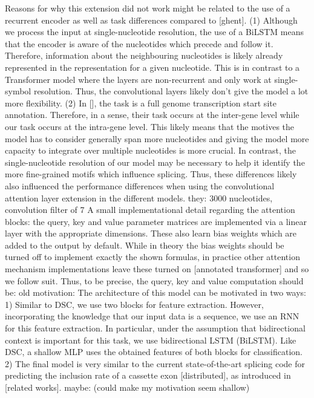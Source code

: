 Reasons for why this extension did not work might be related to the use of a recurrent encoder as well as task differences compared to [ghent].
(1) Although we process the input at single-nucleotide resolution, the use of a BiLSTM means that the encoder is aware of the nucleotides which precede and follow it. Therefore, information about the neighbouring nucleotides is likely already represented in the representation for a given nucleotide. This is in contrast to a Transformer model where the layers are non-recurrent and only work at single-symbol resolution. Thus, the convolutional layers likely don't give the model a lot more flexibility.
(2) In [], the task is a full genome transcription start site annotation. Therefore, in a sense, their task occurs at the inter-gene level while our task occurs at the intra-gene level. This likely means that the motives the model has to consider generally span more nucleotides and giving the model more capacity to integrate over multiple nucleotides is more crucial. In contrast, the single-nucleotide resolution of our model may be necessary to help it identify the more fine-grained motifs which influence splicing. Thus, these differences likely also influenced the performance differences when using the convolutional attention layer extension in the different models.
they: 3000 nucleotides, convolution filter of 7
A small implementational detail regarding the attention blocks: the query, key and value parameter matrices are implemented via a linear layer with the appropriate dimensions. These also learn bias weights which are added to the output by default. While in theory the bias weights should be turned off to implement exactly the shown formulas, in practice other attention mechanism implementations leave these turned on [annotated transformer] and so we follow suit. Thus, to be precise, the query, key and value computation should be:
old motivation:
The architecture of this model can be motivated in two ways:
1) Similar to DSC, we use two blocks for feature extraction. However, incorporating the knowledge that our input data is a sequence, we use an RNN for this feature extraction. In particular, under the assumption that bidirectional context is important for this task, we use bidirectional LSTM (BiLSTM). Like DSC, a shallow MLP uses the obtained features of both blocks for classification.
2)
The final model is very similar to the current state-of-the-art splicing code for predicting the inclusion rate of a cassette exon [distributed], as introduced in [related works].
maybe: (could make my motivation seem shallow)
